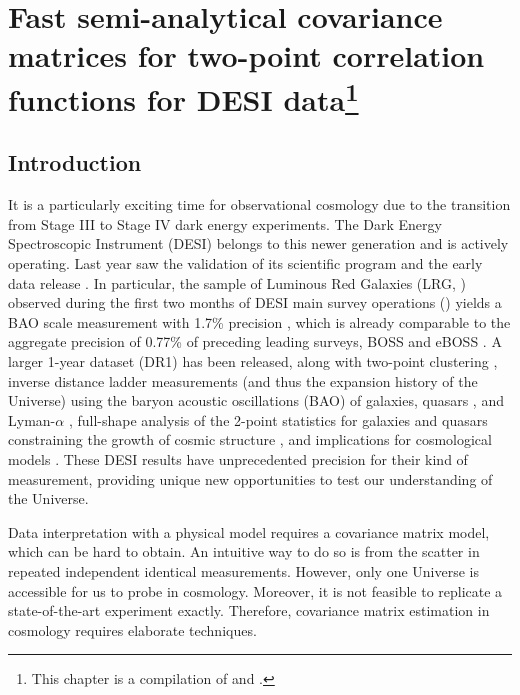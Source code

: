 \chapter{Fast semi-analytical covariance matrices for two-point correlation functions for DESI data\texorpdfstring{\footnote{This chapter is a compilation of \cite{2023MNRAS.524.3894R} and \cite{KP4s7-Rashkovetskyi}.}}{}}
\label{ch:RascalC}
\graphicspath{{RascalC-combined/}}

\section{Introduction}

It is a particularly exciting time for observational cosmology due to the transition from Stage III to Stage IV dark energy experiments.
The Dark Energy Spectroscopic Instrument (DESI) \citep{DESI2016a.Science,DESI2022.KP1.Instr} belongs to this newer generation and is actively operating.
Last year saw the validation of its scientific program \citep{DESI2023a.KP1.SV} and the early data release \citep{DESI2023b.KP1.EDR}.
In particular, the sample of Luminous Red Galaxies (LRG, \cite{LRG.TS.Zhou.2023}) observed during the first two months of DESI main survey operations (\desimtwo{}) yields a BAO scale measurement with 1.7\% precision \citep{BAO.EDR.Moon.2023}, which is already comparable to the aggregate precision of 0.77\% of preceding leading surveys, BOSS and eBOSS \citep{SDSS4-eBOSS-Alam21}.
A larger 1-year dataset (DR1) \citep{DESI2024.I.DR1} has been released,
along with two-point clustering \citep{DESI2024.II.KP3},
inverse distance ladder measurements (and thus the expansion history of the Universe) using the baryon acoustic oscillations (BAO) of galaxies, quasars \citep{DESI2024.III.KP4},
and Lyman-$\alpha$ \citep{DESI2024.IV.KP6},
full-shape analysis of the 2-point statistics for galaxies and quasars constraining the growth of cosmic structure \citep{DESI2024.V.KP5},
and implications for cosmological models \citep{DESI2024.VI.KP7A,DESI2024.VII.KP7B,ChaussidonY1fnl}.
These DESI results have unprecedented precision for their kind of measurement, providing unique new opportunities to test our understanding of the Universe.

Data interpretation with a physical model requires a covariance matrix model, which can be hard to obtain.
An intuitive way to do so is from the scatter in repeated independent identical measurements.
However, only one Universe is accessible for us to probe in cosmology.
Moreover, it is not feasible to replicate a state-of-the-art experiment exactly.
Therefore, covariance matrix estimation in cosmology requires elaborate techniques.

